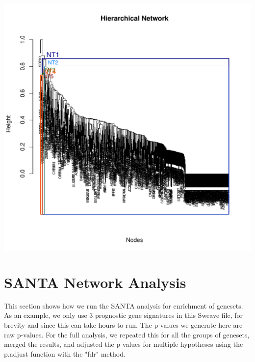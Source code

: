 \documentclass{article}\usepackage[]{graphicx}\usepackage[]{color}
\makeatletter
\def\maxwidth{ %
  \ifdim\Gin@nat@width>\linewidth
    \linewidth
  \else
    \Gin@nat@width
  \fi
}
\newenvironment{knitrout}{}{} %
\makeatother
\begin{document}
\begin{knitrout}
\includegraphics[width=\maxwidth]{figure/RedeR_Visualization-3} 

\end{knitrout}

\section{SANTA Network Analysis}
This section shows how we run the SANTA analysis for enrichment of genesets. As an example, we only use 3 prognostic gene signatures in this Sweave file, for brevity and since this can take hours to run. The p-values we generate here are raw p-values. For the full analysis, we repeated this for all the groups of genesets, merged the results, and adjusted the p values for multiple hypotheses using the p.adjust function with the "fdr" method.
\end{document}
